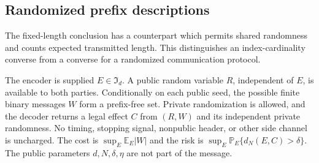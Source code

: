 \subsection{Randomized prefix descriptions}
The fixed-length conclusion has a counterpart which permits shared
randomness and counts expected transmitted length.  This distinguishes
an index-cardinality converse from a converse for a randomized
communication protocol.

\begin{definition}
\label{def:prefixdescription79}
The encoder is supplied $E\in\mathfrak I_d$.  A public random
variable $R$, independent of $E$, is available to both parties.
Conditionally on each public seed, the possible finite binary
messages $W$ form a prefix-free set.  Private randomization is
allowed, and the decoder returns a legal effect $C$ from $(R,W)$
and its independent private randomness.  No timing, stopping signal,
nonpublic header, or other side channel is uncharged.  The cost is
$\sup_E\mathbb E_E|W|$ and the risk is
$\sup_E\mathbb P_E\{d_N(E,C)>\delta\}$.  The public parameters
$d,N,\delta,\eta$ are not part of the message.
\end{definition}

